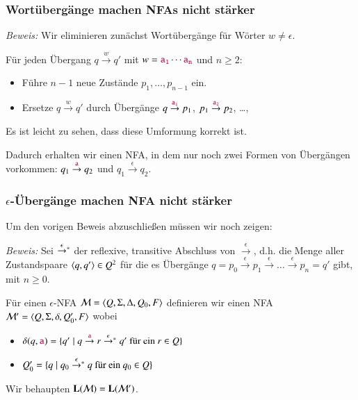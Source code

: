 \documentclass[onlymath]{beamer}
\begin{document}
\begin{frame}\frametitle{Wortübergänge machen NFAs nicht stärker}

\pause

\emph{Beweis:} Wir eliminieren zunächst Wortübergänge für Wörter $w\neq\epsilon$.\medskip
\pause

Für jeden Übergang $q\stackrel{w}{\to}q'$ mit $w=\mathtt{\textcolor{purple}{a_1}}\cdots \mathtt{\textcolor{purple}{a_n}}$ und $n\geq 2$:\\
\begin{itemize}
\item Führe $n-1$ neue Zustände $p_1,\ldots,p_{n-1}$ ein.
\item Ersetze $q\stackrel{w}{\to}q'$ durch Übergänge $q\stackrel{\mathtt{\textcolor{purple}{a_1}}}{\to}p_1$, $p_1\stackrel{\mathtt{\textcolor{purple}{a_2}}}{\to}p_2$, \ldots, 
\end{itemize}
Es ist leicht zu sehen, dass diese Umformung korrekt ist.
\bigskip

Dadurch erhalten wir einen NFA, in dem nur noch zwei Formen von Übergängen vorkommen:
$q_1\stackrel{\mathtt{\textcolor{purple}{a}}}{\to}q_2$ und $q_1\stackrel{\epsilon}{\to}q_2$.

\end{frame}

\begin{frame}\frametitle{$\epsilon$-Übergänge machen NFA nicht stärker}


Um den vorigen Beweis abzuschließen müssen wir noch zeigen:

\pause

\emph{Beweis:} Sei $\mathrel{\mathord{\stackrel{\epsilon}{\to}}{}^*}$ der reflexive, transitive Abschluss von $\stackrel{\epsilon}{\to}$, d.h. die Menge aller Zustandspaare $\langle{q,q'}\rangle\in Q^2$ für die es Übergänge $q=p_0\stackrel{\epsilon}{\to} p_1\stackrel{\epsilon}{\to}\ldots\stackrel{\epsilon}{\to}p_n=q'$ gibt, mit $n\geq 0$.
\medskip\pause

Für einen $\epsilon$-NFA $\mathcal{M}=\langle{Q,\Sigma,\Delta,Q_0,F}\rangle$ definieren wir einen NFA
$\mathcal{M}'=\langle{Q,\Sigma,\delta,Q_0',F}\rangle$ wobei
\begin{itemize}
\item $\delta(q,\mathtt{\textcolor{purple}{a}})=\{ q'\mid q\stackrel{\mathtt{\textcolor{purple}{a}}}{\to}r\mathrel{\mathord{\stackrel{\epsilon}{\to}}{}^*} q'\text{ für ein }r\in Q\}$
\item $Q_0'=\{q\mid q_0\mathrel{\mathord{\stackrel{\epsilon}{\to}}{}^*} q\text{ für ein }q_0\in Q\}$
\end{itemize}
Wir behaupten $\textbf{\textcolor{black}{L}}(\mathcal{M})=\textbf{\textcolor{black}{L}}(\mathcal{M}')$.

\end{frame}
\end{document}

